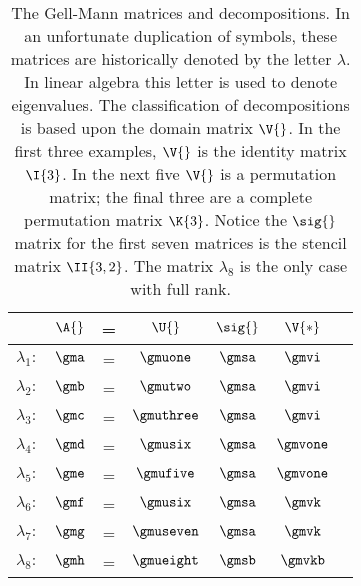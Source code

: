 \begin{table}[htdp]
\caption[The Gell-Mann matrices and decompositions]{The Gell-Mann matrices and decompositions. In an unfortunate duplication of symbols, these matrices are historically denoted by the letter $\lambda$. In linear algebra this letter is used to denote eigenvalues. The classification of decompositions is based upon the domain matrix $\V{}$. In the first three examples, $\V{}$ is the identity matrix $\I{3}$. In the next five $\V{}$ is a permutation matrix; the final three are a complete permutation matrix $\K{3}$. Notice the $\sig{}$ matrix for the first seven matrices is the stencil matrix $\II{3,2}$. The matrix $\lambda_{8}$ is the only case with full rank.}
\begin{center}
\begin{tabular}{rcccccc}
%
  & $\A{}$  & = & $\U{}$  & $\sig{}$   & $\V{*}$ \\\hline
%
$ \lambda_{1}:$ & $\gma$  & = & $\gmuone$   & $\gmsa$ & $\gmvi$ \\
%
$ \lambda_{2}:$ & $\gmb$  & = & $\gmutwo$   & $\gmsa$ & $\gmvi$ \\
%
$ \lambda_{3}:$ & $\gmc$  & = & $\gmuthree$ & $\gmsa$ & $\gmvi$ \\[20pt]
%  
$ \lambda_{4}:$ & $\gmd$  & = & $\gmusix$   & $\gmsa$ & $\gmvone$ \\
%
$ \lambda_{5}:$ & $\gme$  & = & $\gmufive$  & $\gmsa$ & $\gmvone$ \\[20pt]
%
$ \lambda_{6}:$ & $\gmf$  & = & $\gmusix$   & $\gmsa$ & $\gmvk$ \\
%
$ \lambda_{7}:$ & $\gmg$  & = & $\gmuseven$ & $\gmsa$ & $\gmvk$ \\
%
$ \lambda_{8}:$ & $\gmh$  & = & $\gmueight$ & $\gmsb$ & $\gmvkb$ \\
%
\end{tabular}
\end{center}
\label{tab:gellmann}
\end{table}

\endinput